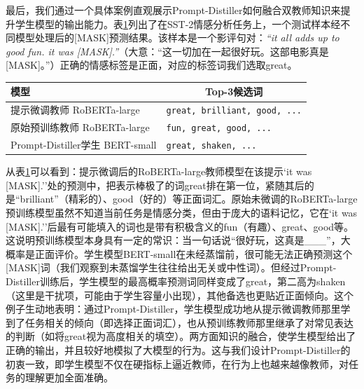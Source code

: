 \documentclass[../main.tex]{subfiles}
\begin{document}
\label{sec:3-5-5}
最后，我们通过一个具体案例直观展示Prompt-Distiller如何融合双教师知识来提升学生模型的输出能力。表\ref{tab:case-study}列出了在SST-2情感分析任务上，一个测试样本经不同模型处理后的[MASK]预测结果。该样本是一个影评句对：\textit{“it all adds up to good fun. it was [MASK].”}（大意：“这一切加在一起很好玩。这部电影真是[MASK]。”）正确的情感标签是正面，对应的标签词我们选取great。

\begin{table}[htbp]
	\centering
	\label{tab:case-study}
	\small\begin{tabular}{l|p{6cm}}
		\toprule[1pt]
		\textbf{模型}                   & \multicolumn{1}{c}{\textbf{Top-3候选词}}       \\
		\midrule[0.5pt]
		提示微调教师 RoBERTa-large          & \texttt{\small great, brilliant, good, ...} \\
		原始预训练教师 RoBERTa-large         & \texttt{\small fun, great, good, ...}       \\
		Prompt-Distiller学生 BERT-small & \texttt{\small great, shaken, ...}          \\
		\bottomrule[1pt]
	\end{tabular}
\end{table}

从表\ref{tab:case-study}可以看到：提示微调后的RoBERTa-large教师模型在该提示`it was [MASK].''处的预测中，把表示棒极了的词great排在第一位，紧随其后的是“brilliant”（精彩的）、good（好的）等正面词汇。原始未微调的RoBERTa-large预训练模型虽然不知道当前任务是情感分类，但由于庞大的语料记忆，它在`it was [MASK].''后最有可能填入的词也是带有积极含义的fun（有趣）、great、good等。这说明预训练模型本身具有一定的常识：当一句话说“很好玩，这真是\_\_\_”，大概率是正面评价。学生模型BERT-small在未经蒸馏前，很可能无法正确预测这个[MASK]词（我们观察到未蒸馏学生往往给出无关或中性词）。但经过Prompt-Distiller训练后，学生模型的最高概率预测词同样变成了great，第二高为shaken（这里是干扰项，可能由于学生容量小出现），其他备选也更贴近正面倾向。这个例子生动地表明：通过Prompt-Distiller，学生模型成功地从提示微调教师那里学到了任务相关的倾向（即选择正面词汇），也从预训练教师那里继承了对常见表达的判断（如将great视为高度相关的填空）。两方面知识的融合，使学生模型给出了正确的输出，并且较好地模拟了大模型的行为。这与我们设计Prompt-Distiller的初衷一致，即学生模型不仅在硬指标上逼近教师，在行为上也越来越像教师，对任务的理解更加全面准确。
\end{document}
